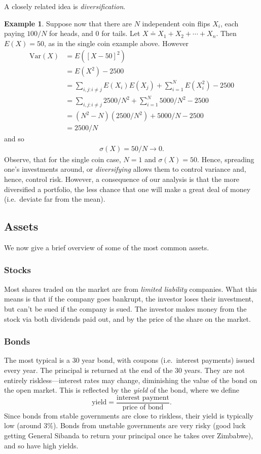 \documentclass[12pt]{article}
\theoremstyle{plain}
\theoremstyle{definition}
\newtheorem*{example}{Example}
\theoremstyle{remark}
\numberwithin{equation}{section}  %
\begin{document}
A closely related idea is \emph{diversification}. 
\begin{example}
	Suppose now that there are $N$ independent coin flips $X_i$, each paying 
	$100/N$ for heads, and $0$ for tails. Let $X \doteq X_1 + X_2 + \cdots + 
	X_n$. Then $E(X) = 50$, as in the single coin example above. However
	\begin{align*}
		\text{Var}(X)
		& = E({[X - 50]}^2)
		\\
		& = E(X^2) - 2500
		\\
		& = \sum_{i,j: i \neq j} E(X_i)E(X_j) + \sum_{i=1}^N E(X_i^2) - 2500 
		\\
		& = \sum_{i,j: i \neq j} 2500/N^2 + \sum_{i=1}^{N} 5000/N^2 - 2500
		\\
		& = (N^{2} - N)(2500/N^2) + 5000/N - 2500
		\\
		& = 2500/N 
	\end{align*}
	and so
	\begin{align*}
		\sigma(X) = 50/N \to 0.
	\end{align*}
	Observe, that for the single coin case, $N = 1$ and $\sigma(X) = 50$.
	Hence, spreading one's investments around, or \emph{diversifying} allows 
	them to
	control variance and, hence, control risk. However, a consequence of our 
	analysis is that the more diversified a portfolio, the less chance that one 
	will make a great deal of money (i.e.\ deviate far from the mean).  
\end{example}
\subsection{Assets}
We now give a brief overview of some of the most common assets.

\subsubsection{Stocks}
Most shares traded on the market are from \emph{limited liability} companies.
What this means is that if the company goes bankrupt, the investor loses their 
investment, but can't be sued if the company is sued. The investor makes money 
from the stock via both dividends paid out, and by the price of the share on 
the market.

\subsubsection{Bonds} 
The most typical is a $30$ year bond, with coupons (i.e.\ interest payments) 
issued every year. The principal is returned at the end of the $30$ years.
They are  not entirely riskless---interest rates may change, diminishing the 
value of the bond on the open market. This is reflected by the \emph{yield} of 
the bond, where we define \begin{equation*}
	\text{yield} = \frac{\text{interest payment}}{\text{price of bond}}.
\end{equation*}
Since bonds from stable governments are close to riskless, their yield is 
typically low (around $3\%$). Bonds from unstable governments are very risky 
(good luck getting General Sibanda to return your principal once he takes over 
Zimbabwe), and so have high yields.
\end{document}
